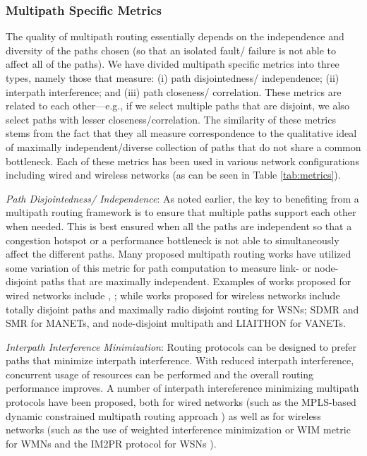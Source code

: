\documentclass[10pt]{IEEEtran}
\begin{document}
\vspace{2mm}
\subsubsection{Multipath Specific Metrics}

The quality of multipath routing essentially depends on the independence and diversity of the paths chosen (so that an isolated fault/ failure is not able to affect all of the paths). We have divided multipath specific metrics into three types, namely those that measure: (i) path disjointedness/ independence; (ii) interpath interference; and (iii) path closeness/ correlation. These metrics are related to each other---e.g., if we select multiple paths that are disjoint, we also select paths with lesser closeness/correlation. The similarity of these metrics stems from the fact that they all measure correspondence to the qualitative ideal of maximally independent/diverse collection of paths that do not share a common bottleneck. Each of these metrics has been used in various network configurations including wired and wireless networks (as can be seen in Table \ref{tab:metrics}). 

\vspace{2mm}
\textit{Path Disjointedness/ Independence}: As noted earlier, the key to benefiting from a multipath routing framework is to ensure that multiple paths support each other when needed. This is best ensured when all the paths are independent so that a congestion hotspot or a performance bottleneck is not able to simultaneously affect the different paths. Many proposed multipath routing works have utilized some variation of this metric for path computation to measure link- or node-disjoint paths that are maximally independent. Examples of works proposed for wired networks include \cite{sidhu1991finding}, \cite{guo2003link}; while works proposed for wireless networks include totally disjoint paths \cite{waharte2006totally} and maximally radio disjoint routing \cite{maimour2008maximally} for WSNs; SDMR \cite{galvez2008spatially} and SMR \cite{lee2001split} for MANETs, and node-disjoint multipath and LIAITHON \cite{wang2012liaithon} for VANETs.

\vspace{2mm}
\textit{Interpath Interference Minimization}: Routing protocols can be designed to prefer paths that minimize interpath interference. With reduced interpath interference, concurrent usage of resources can be performed and the overall routing performance improves. A number of interpath intereference minimizing multipath protocols have been proposed, both for wired networks (such as the MPLS-based dynamic constrained multipath routing approach \cite{seok2001dynamic}) as well as for wireless networks (such as the use of weighted interference minimization or WIM metric for WMNs \cite{tsai2007interference} and the IM2PR protocol for WSNs \cite{radi2014im2pr}).
\end{document}
